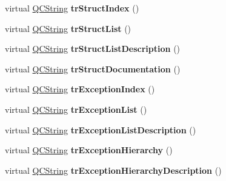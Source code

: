 \begin{DoxyCompactItemize}
\mbox{\label{class_translator_english_a0db6122ee887ef308bfdeaee99b96753}} 
virtual \mbox{\hyperlink{class_q_c_string}{Q\+C\+String}} {\bfseries tr\+Struct\+Index} ()
\item 
\mbox{\label{class_translator_english_a170d30280edfc8bbdce24a4d2661b9ae}} 
virtual \mbox{\hyperlink{class_q_c_string}{Q\+C\+String}} {\bfseries tr\+Struct\+List} ()
\item 
\mbox{\label{class_translator_english_a80c81649d2d20d2036123322c3e49f4e}} 
virtual \mbox{\hyperlink{class_q_c_string}{Q\+C\+String}} {\bfseries tr\+Struct\+List\+Description} ()
\item 
\mbox{\label{class_translator_english_abf72c3e55194afb6f6805b31ebdf182f}} 
virtual \mbox{\hyperlink{class_q_c_string}{Q\+C\+String}} {\bfseries tr\+Struct\+Documentation} ()
\item 
\mbox{\label{class_translator_english_a2df838ce696b659ae7df12c649b7c155}} 
virtual \mbox{\hyperlink{class_q_c_string}{Q\+C\+String}} {\bfseries tr\+Exception\+Index} ()
\item 
\mbox{\label{class_translator_english_aee4b7b151366ba2c993f89781ccf11d5}} 
virtual \mbox{\hyperlink{class_q_c_string}{Q\+C\+String}} {\bfseries tr\+Exception\+List} ()
\item 
\mbox{\label{class_translator_english_a002f55c17d602f159815ee9e44dc6df7}} 
virtual \mbox{\hyperlink{class_q_c_string}{Q\+C\+String}} {\bfseries tr\+Exception\+List\+Description} ()
\item 
\mbox{\label{class_translator_english_abf4d2d8b97f118da181824e7ade1fe68}} 
virtual \mbox{\hyperlink{class_q_c_string}{Q\+C\+String}} {\bfseries tr\+Exception\+Hierarchy} ()
\item 
\mbox{\label{class_translator_english_a4c259afae48a41ec33d66d4166575782}} 
virtual \mbox{\hyperlink{class_q_c_string}{Q\+C\+String}} {\bfseries tr\+Exception\+Hierarchy\+Description} ()
\item 

\end{DoxyCompactItemize}
